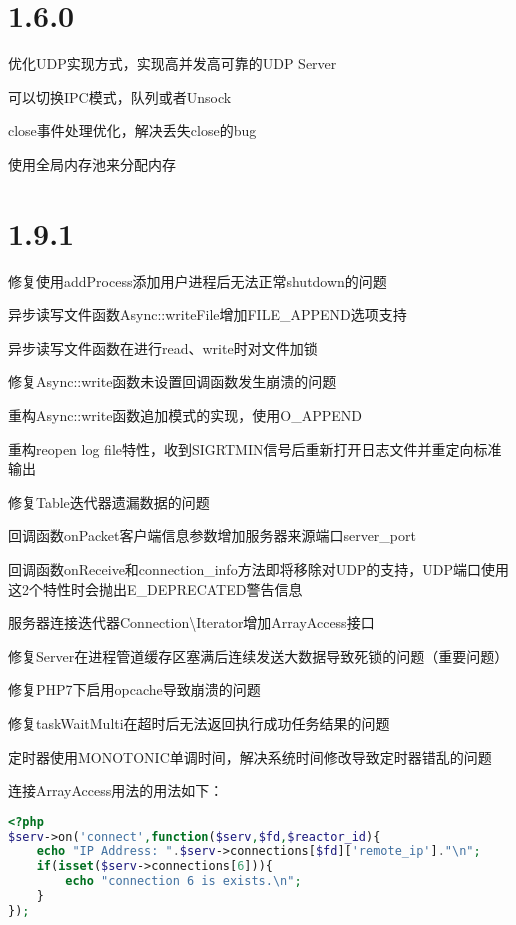 \section{1.6.0}

\begin{compactitem}
\item 优化UDP实现方式，实现高并发高可靠的UDP Server
\item 可以切换IPC模式，队列或者Unsock
\item close事件处理优化，解决丢失close的bug
\item 使用全局内存池来分配内存
\end{compactitem}

\section{1.9.1}


\begin{compactitem}
\item 修复使用addProcess添加用户进程后无法正常shutdown的问题
\item 异步读写文件函数Async::writeFile增加FILE\_APPEND选项支持
\item 异步读写文件函数在进行read、write时对文件加锁
\item 修复Async::write函数未设置回调函数发生崩溃的问题
\item 重构Async::write函数追加模式的实现，使用O\_APPEND
\item 重构reopen log file特性，收到SIGRTMIN信号后重新打开日志文件并重定向标准输出
\item 修复Table迭代器遗漏数据的问题
\item 回调函数onPacket客户端信息参数增加服务器来源端口server\_port
\item 回调函数onReceive和connection\_info方法即将移除对UDP的支持，UDP端口使用这2个特性时会抛出E\_DEPRECATED警告信息
\item 服务器连接迭代器Connection\textbackslash Iterator增加ArrayAccess接口
\item 修复Server在进程管道缓存区塞满后连续发送大数据导致死锁的问题（重要问题）
\item 修复PHP7下启用opcache导致崩溃的问题
\item 修复taskWaitMulti在超时后无法返回执行成功任务结果的问题
\item 定时器使用MONOTONIC单调时间，解决系统时间修改导致定时器错乱的问题
\end{compactitem}


连接ArrayAccess用法的用法如下：

\begin{lstlisting}[language=PHP]
<?php
$serv->on('connect',function($serv,$fd,$reactor_id){
    echo "IP Address: ".$serv->connections[$fd]['remote_ip']."\n";
    if(isset($serv->connections[6])){
        echo "connection 6 is exists.\n";
    }
});
\end{lstlisting}
